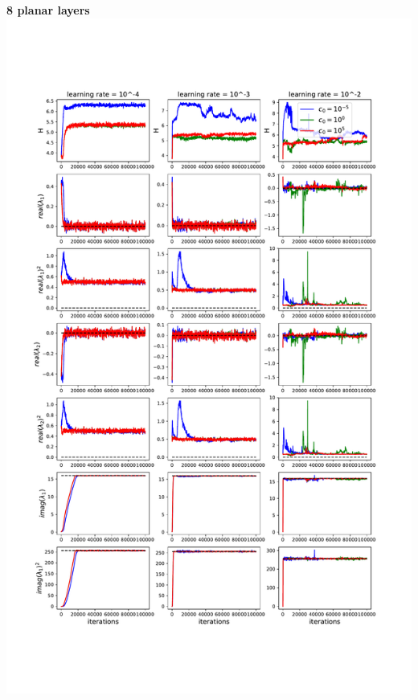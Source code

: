 \documentclass[11pt]{article}
\begin{document}
\clearpage
\begin{center}
\textbf{8 planar layers} \\
\includegraphics[scale=.45]{images/learnA_8P.pdf} \\
\end{center}
\end{document}

